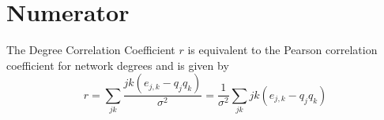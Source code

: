 \section{Numerator}

The Degree Correlation Coefficient $r$ is equivalent to the Pearson correlation coefficient for network degrees and is given by
\[
    r = \sum_{j k} \frac{j k \left(e_{j,k} - q_j q_k\right)}{\sigma^2} = \frac{1}{\sigma^2} \sum_{j k} j k \left(e_{j,k} - q_j q_k\right)
    \tag{7.11} \label{eq:coefficient}
\]
